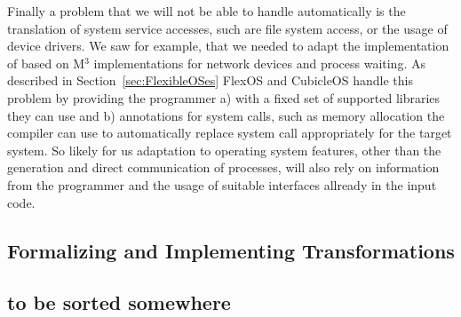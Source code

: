 Finally a problem that we will not be able to handle automatically is the translation of system service accesses, such are file system access, or the usage of device drivers. We saw for example, that we needed to adapt the implementation of  based on M$^3$ implementations for network devices and process waiting. As described in Section~\ref{sec:FlexibleOSes} FlexOS and CubicleOS handle this problem by providing the programmer a) with a fixed set of supported libraries they can use and b) annotations for system calls, such as memory allocation the compiler can use to automatically replace system call appropriately for the target system. So likely for us adaptation to operating system features, other than the generation and direct communication of processes, will also rely on information from the programmer and the usage of suitable interfaces allready in the input code.

\subsection{Formalizing and Implementing Transformations}

\subsection{to be sorted somewhere}

